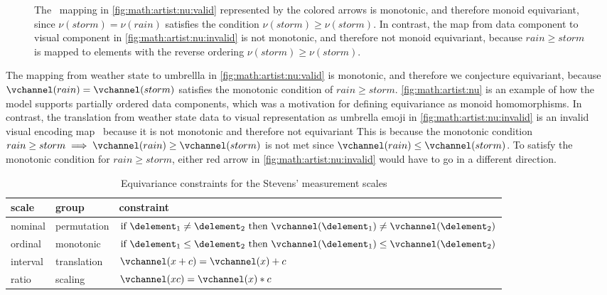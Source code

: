 \documentclass[../main.tex]{subfiles}
\begin{document}
\begin{figure}[htb]
\begin{subfigure}{.49\textwidth}
    \caption{}
    \label{fig:math:artist:nu:invalid}
  \end{subfigure}
  \caption{ The \vchannel\ mapping in \autoref{fig:math:artist:nu:valid} represented by the colored arrows is monotonic, and therefore monoid equivariant,  since $\nu(storm)=\nu(rain)$ satisfies the condition $\nu(storm) \geq \nu(storm)$. In contrast, the map from data component to visual component in \autoref{fig:math:artist:nu:invalid} is not monotonic, and therefore not monoid equivariant, because $rain \geq storm$ is mapped to elements with the reverse ordering $\nu(storm) \geq \nu(storm)$.}
  \label{fig:math:artist:nu}
\end{figure}
The mapping from weather state to umbrellla in \autoref{fig:math:artist:nu:valid} is monotonic, and therefore we conjecture equivariant, because $\vchannel(rain) = \vchannel(storm)$ satisfies the monotonic condition of $rain \geq storm$. \autoref{fig:math:artist:nu} is an example of how the model supports partially ordered data components, which was a motivation for defining equivariance as monoid homomorphisms. In contrast, the translation from weather state data to visual representation as umbrella emoji in \autoref{fig:math:artist:nu:invalid} is an invalid visual encoding map \vchannel\ because it is not monotonic and therefore not equivariant This is because the monotonic condition \(rain \geq storm \implies \vchannel(rain) \geq  \vchannel(storm)\) is not met since \(\vchannel(rain) \leq\vchannel(storm)\). To satisfy the monotonic condition for $rain \geq storm$, either red arrow in \autoref{fig:math:artist:nu:invalid} would have to go in a different direction.

\begin{table}[H]
\centering
  \renewcommand{\arraystretch}{2}
  \begin{tabulary}{\columnwidth}{|llL|}\hline
      \textbf{scale} & \textbf{group} & \textbf{constraint}\\ \hline
      nominal & permutation &  $\text{if } \delement_1 \neq \delement_2 \text{ then } \vchannel (\delement_1) \neq\vchannel(\delement_2)$\\
      ordinal &  monotonic & $\text{if } \delement_1 \leq \delement_2 \text{ then } \vchannel (\delement_1) \leq \vchannel(\delement_2)$\\
      interval &  translation &  $\vchannel (x + c) = \vchannel(x) + c$ \\
      ratio &  scaling &  $\vchannel(xc) = \vchannel(x)*c $\\ \hline
  \end{tabulary}
  \caption{Equivariance constraints for the Stevens' measurement scales\cite{MeasurementScalesStatistics}}
  \label{tab:math:artist:nu}
\end{table}
\end{document}
